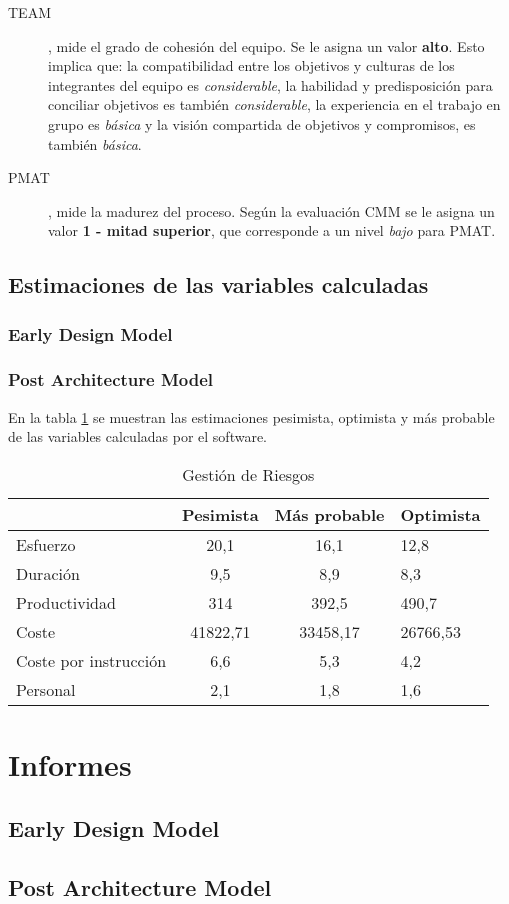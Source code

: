 \documentclass[11pt,a4paper,spanish,twoside]{book}
\begin{document}
\begin{description}
\item[TEAM], mide el grado de cohesión del equipo. Se le asigna un valor
\textbf{alto}. Esto implica que: la compatibilidad entre los objetivos y
culturas de los integrantes del equipo es \emph{considerable}, la habilidad
y predisposición para conciliar objetivos es también \emph{considerable}, la
experiencia en el trabajo en grupo es \emph{básica} y la visión compartida
de objetivos y compromisos, es también \emph{básica}.

\item[PMAT], mide la madurez del proceso. Según la evaluación CMM se le asigna
un valor \textbf{1 - mitad superior}, que corresponde a un nivel \emph{bajo}
para PMAT.
\end{description}

\section{Estimaciones de las variables calculadas}
\subsection{Early Design Model}

\subsection{Post Architecture Model}
En la tabla \ref{Tab:EstPOMP} se muestran las estimaciones pesimista,
optimista y más probable de las variables calculadas por el software.
\begin{table}[!h]
  \centering
  \begin{tabular}{p{4.5cm}|c|c|b{2cm}<{\centering}}
    & \textbf{Pesimista} & \textbf{Más probable} & \textbf{Optimista}\\
    \hline \hline
    Esfuerzo & 20,1 & 16,1 & 12,8 \\ \hline
    Duración & 9,5 & 8,9 & 8,3 \\ \hline
    Productividad & 314 & 392,5 & 490,7 \\ \hline
    Coste & 41822,71 & 33458,17 & 26766,53 \\ \hline
    Coste por instrucción & 6,6 & 5,3 & 4,2 \\ \hline
    Personal & 2,1 & 1,8 & 1,6 \\ \hline
  \end{tabular}
  \caption{Gestión de Riesgos} \label{Tab:EstPOMP}
\end{table}

\chapter{Informes}
\section{Early Design Model}
\section{Post Architecture Model}
\end{document}
